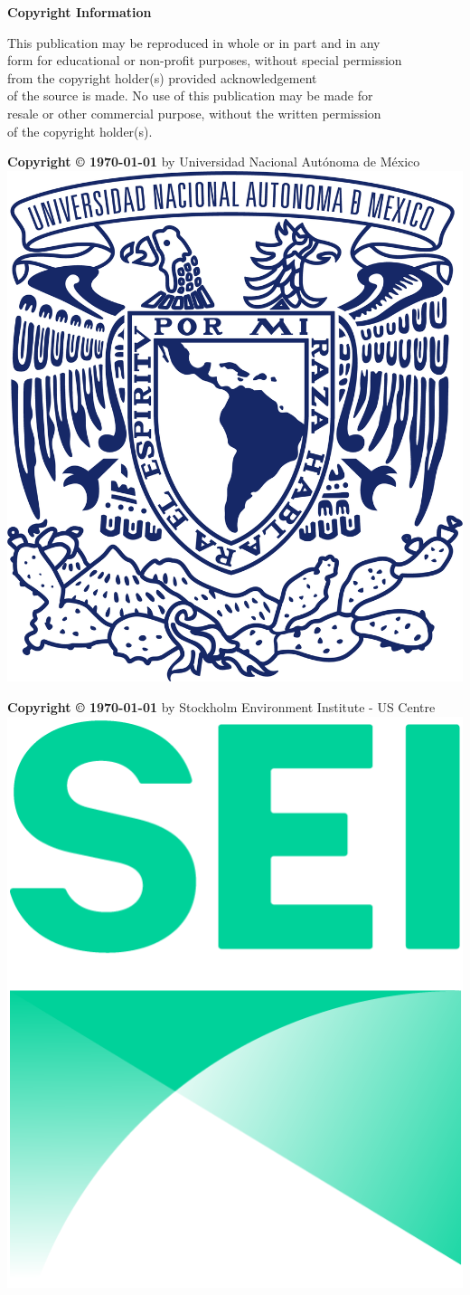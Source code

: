\documentclass{article}
\begin{document}
\thispagestyle{empty} %
\vspace*{\fill} %
\begin{center}
    \Large \textbf{Copyright Information}

    \vspace{0.5cm} %

    \normalsize
    This publication may be reproduced in whole or in part and in any\\
    form for educational or non-profit purposes, without special permission\\
    from the copyright holder(s) provided acknowledgement\\
    of the source is made. No use of this publication may be made for\\
    resale or other commercial purpose, without the written permission\\
    of the copyright holder(s).

    \bigskip

    \textbf{Copyright © \today\enspace}
    by Universidad Nacional Autónoma de México\\
    \smallskip
\includegraphics[width=0.075\linewidth]{./logos/UNAM.png}

    \bigskip

    \textbf{Copyright © \today{}\enspace}
    by Stockholm Environment Institute - US Centre\\
    \smallskip
    \includegraphics[width=0.1\linewidth]{./logos/SEI.png}
\end{center}

\vspace*{\fill} %
\end{document}
